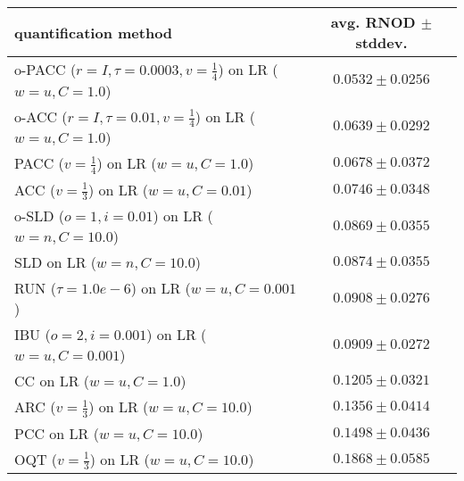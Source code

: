 \begin{tabular}{lc}
  \toprule
  quantification method & avg. RNOD $\pm$ stddev. \\
  \midrule
  o-PACC ($r=I, \tau=0.0003, v=\frac{1}{4}$) on LR ($w=u, C=1.0$) & $\mathbf{0.0532 \pm 0.0256}$ \\
  o-ACC ($r=I, \tau=0.01, v=\frac{1}{4}$) on LR ($w=u, C=1.0$) & $0.0639 \pm 0.0292$ \\
  PACC ($v=\frac{1}{4}$) on LR ($w=u, C=1.0$) & $0.0678 \pm 0.0372$ \\
  ACC ($v=\frac{1}{3}$) on LR ($w=u, C=0.01$) & $0.0746 \pm 0.0348$ \\
  o-SLD ($o=1, i=0.01$) on LR ($w=n, C=10.0$) & $0.0869 \pm 0.0355$ \\
  SLD on LR ($w=n, C=10.0$) & $0.0874 \pm 0.0355$ \\
  RUN ($\tau=1.0e-6$) on LR ($w=u, C=0.001$) & $0.0908 \pm 0.0276$ \\
  IBU ($o=2, i=0.001$) on LR ($w=u, C=0.001$) & $0.0909 \pm 0.0272$ \\
  CC on LR ($w=u, C=1.0$) & $0.1205 \pm 0.0321$ \\
  ARC ($v=\frac{1}{3}$) on LR ($w=u, C=10.0$) & $0.1356 \pm 0.0414$ \\
  PCC on LR ($w=u, C=10.0$) & $0.1498 \pm 0.0436$ \\
  OQT ($v=\frac{1}{3}$) on LR ($w=u, C=10.0$) & $0.1868 \pm 0.0585$ \\
  \bottomrule
\end{tabular}
